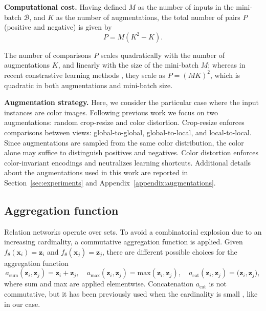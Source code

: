 \documentclass{article}
\begin{document}
\textbf{Computational cost.} Having defined $M$ as the number of inputs in the mini-batch $\mathcal{B}$, and $K$ as the number of augmentations, the total number of pairs $P$ (positive and negative) is given by
\begin{equation}
P = M (K^{2}- K).
\end{equation}

The number of comparisons $P$ scales quadratically with the number of augmentations $K$, and linearly with the size of the mini-batch $M$; whereas in recent constrastive learning methods \citep{chen2020simple}, they scale as $P = (MK)^{2}$, which is quadratic in both augmentations and mini-batch size. 

\textbf{Augmentation strategy.}
Here, we consider the particular case where the input instances are color images. Following previous work \citep{chen2020simple} we focus on two augmentations: random crop-resize and color distortion. Crop-resize enforces comparisons between views: global-to-global, global-to-local, and local-to-local. Since augmentations are sampled from the same color distribution, the color alone may suffice to distinguish positives and negatives. Color distortion enforces color-invariant encodings and neutralizes learning shortcuts. Additional details about the augmentations used in this work are reported in Section~\ref{sec:experiments} and Appendix~\ref{appendix:augmentations}.


\subsection{Aggregation function}\label{ssec:aggregation_funciton}

Relation networks operate over sets. To avoid a combinatorial explosion due to an increasing cardinality, a commutative aggregation function is applied. Given  $f_{\theta}(\mathbf{x}_i)=\mathbf{z}_i$ and $f_{\theta}(\mathbf{x}_j)=\mathbf{z}_j$, there are different possible choices for the aggregation function
\begin{equation}
    a_{\text{sum}}(\mathbf{z}_i, \mathbf{z}_j) = \mathbf{z}_i + \mathbf{z}_j, \quad
    a_{\text{max}}(\mathbf{z}_i, \mathbf{z}_j) = \text{max}(\mathbf{z}_i, \mathbf{z}_j),
    \quad
     a_{\text{cat}}(\mathbf{z}_i, \mathbf{z}_j) = \big( \mathbf{z}_i, \mathbf{z}_j \big),
\end{equation}
where sum and max are applied elementwise. Concatenation $a_{\text{cat}}$ is not commutative, but it has been previously used when the cardinality is small \citep{hu2018relation, sung2018learning}, like in our case.
\end{document}
